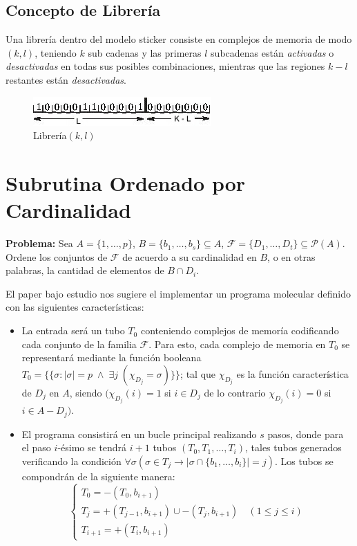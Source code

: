 \documentclass[12pt, letterpaper, twoside]{article}
\begin{document}
    \subsection{Concepto de Librería}
    Una librería dentro del modelo sticker consiste en complejos de memoria de modo $(k,l)$, teniendo $k$ sub cadenas y las primeras $l$ subcadenas están \emph{activadas} o \emph{desactivadas} en todas sus posibles combinaciones, mientras que las regiones $k -l$ restantes están \emph{desactivadas}\autocite{Taghipour2013}.

    \begin{figure}[h!]
        \centering
        \includegraphics[]{libreria.jpg}
        \caption{Librería$(k,l)$}
    \end{figure}

    \section{Subrutina Ordenado por Cardinalidad}
    \textbf{Problema:} Sea $A = \{1,\dots,p\}$, $B = \{b_1,\dots,b_s\} \subseteq A$, $\mathcal{F} = \{D_1,\dots,D_t\} \subseteq \mathcal{P}(A)$. Ordene los conjuntos de $\mathcal{F}$ de acuerdo a su cardinalidad en $B$, o en otras palabras, la cantidad de elementos de $B\cap D_i$.


    El paper bajo estudio nos sugiere el implementar un programa molecular definido con las siguientes características:
    \begin{itemize}
        \item  La entrada será un tubo $T_0$ conteniendo complejos de memoría codificando cada conjunto de la familia $\mathcal{F}$. Para esto, cada complejo de memoria en $T_0$ se representará mediante la función booleana  $T_0=\{\{\sigma:|\sigma|=p\;\land\;\exists{j}\;(\chi_{D_j}=\sigma)\}\}$; tal que $\chi_{D_j}$ es la función característica de $D_j$ en $A$, siendo $(\chi_{D_j}(i) = 1$ si $i \in D_j$ de lo contrario $\chi_{D_j}(i) = 0$ si $i \in A - D_j)$.
        \item  El programa consistirá en un bucle principal realizando $s$ pasos, donde para el paso $i$-ésimo se tendrá $i+1$ tubos $(T_0, T_1,\dots,T_i)$, tales tubos generados verificando la condición $\forall\sigma(\sigma\in T_j \rightarrow|\sigma\cap\{b_1,\dots,b_i\}|=j)$. Los tubos se compondrán de la siguiente manera:
        \begin{equation*}
            \begin{cases}
                T_0=-(T_0,b_{i+1}) \\
                T_j=+(T_{j-1}, b_{i+1}) \cup -(T_j, b_{i+1}) \quad (1\leq{j}\leq{i}) \\
                T_{i+1} = +(T_i,b_{i+1})
            \end{cases}
        \end{equation*}
    \end{itemize}
\end{document}
